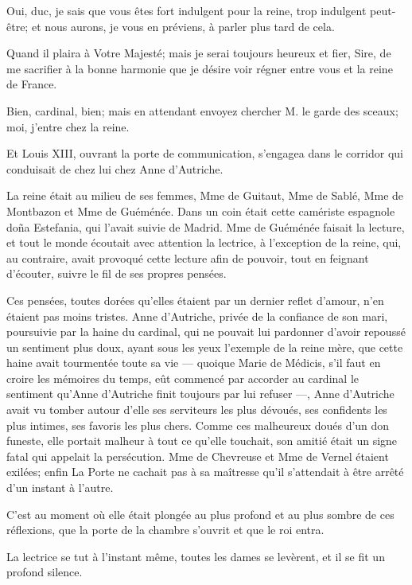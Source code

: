 \speak  Oui, duc, je sais que vous êtes fort indulgent pour la reine, trop indulgent peut-être; et nous aurons, je vous en préviens, à parler plus tard de cela. 

\speak  Quand il plaira à Votre Majesté; mais je serai toujours heureux et fier, Sire, de me sacrifier à la bonne harmonie que je désire voir régner entre vous et la reine de France. 

\speak  Bien, cardinal, bien; mais en attendant envoyez chercher M. le garde des sceaux; moi, j'entre chez la reine. 

Et Louis XIII, ouvrant la porte de communication, s'engagea dans le corridor qui conduisait de chez lui chez Anne d'Autriche. 

La reine était au milieu de ses femmes, Mme de Guitaut, Mme de Sablé, Mme de Montbazon et Mme de Guéménée. Dans un coin était cette camériste espagnole doña Estefania, qui l'avait suivie de Madrid. Mme de Guéménée faisait la lecture, et tout le monde écoutait avec attention la lectrice, à l'exception de la reine, qui, au contraire, avait provoqué cette lecture afin de pouvoir, tout en feignant d'écouter, suivre le fil de ses propres pensées. 

Ces pensées, toutes dorées qu'elles étaient par un dernier reflet d'amour, n'en étaient pas moins tristes. Anne d'Autriche, privée de la confiance de son mari, poursuivie par la haine du cardinal, qui ne pouvait lui pardonner d'avoir repoussé un sentiment plus doux, ayant sous les yeux l'exemple de la reine mère, que cette haine avait tourmentée toute sa vie --- quoique Marie de Médicis, s'il faut en croire les mémoires du temps, eût commencé par accorder au cardinal le sentiment qu'Anne d'Autriche finit toujours par lui refuser ---, Anne d'Autriche avait vu tomber autour d'elle ses serviteurs les plus dévoués, ses confidents les plus intimes, ses favoris les plus chers. Comme ces malheureux doués d'un don funeste, elle portait malheur à tout ce qu'elle touchait, son amitié était un signe fatal qui appelait la persécution. Mme de Chevreuse et Mme de Vernel étaient exilées; enfin La Porte ne cachait pas à sa maîtresse qu'il s'attendait à être arrêté d'un instant à l'autre. 

C'est au moment où elle était plongée au plus profond et au plus sombre de ces réflexions, que la porte de la chambre s'ouvrit et que le roi entra. 

La lectrice se tut à l'instant même, toutes les dames se levèrent, et il se fit un profond silence. 


